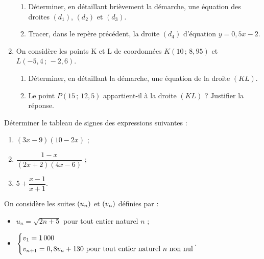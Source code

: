 \documentclass[a4paper,11pt]{article}
\begin{document}
\begin{enumerate}
\begin{center}
	\end{center}
	\begin{enumerate}
		\item Déterminer, en détaillant brièvement la démarche, une équation des droites $(d_1)$, $(d_2)$ et $(d_3)$.
		\item Tracer, dans le repère précédent, la droite $(d_4)$ d'équation $y=0,5x-2$.
	\end{enumerate}
	\item On considère les points K et L de coordonnées $K(10\,;\,8,95)$ et $L(-5,4\,;\,-2,6)$.
	\begin{enumerate}
		\item Déterminer, en détaillant la démarche, une équation de la droite $(KL)$. %
		\item Le point $P(15\,;\,12,5)$ appartient-il à la droite $(KL)$ ? Justifier la réponse.
	\end{enumerate}
\end{enumerate}

\medskip


\medskip

Déterminer le tableau de signes des expressions suivantes :
%
\begin{enumerate}
	\item $(3x-9)(10-2x)$ ;
	\item $\dfrac{1-x}{(2x+2)(4x-6)}$ ;
	\item $5+\dfrac{x-1}{x+1}$.
\end{enumerate}

\newpage


\medskip

On considère les suites $\suiten$ et $\suiten[v]$ définies par :
	
\begin{itemize}[leftmargin=4cm]
	\item $u_n = \sqrt{2n+5}$ pour tout entier naturel $n$ ;
	
	\medskip
	\item $\begin{dcases} v_1 = 1\,000 \\ v_{n+1} = 0,8v_n + 130 \text{ pour tout entier naturel } n \text{ non nul} \end{dcases}$.
\end{itemize}
\end{document}
